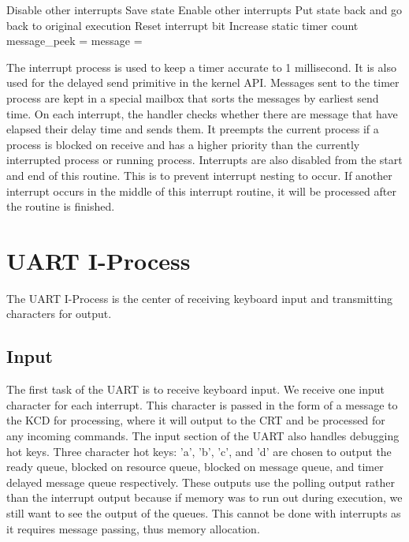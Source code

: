 \documentclass[12pt]{report}
\begin{document}
\begin{algorithmic}
        \State Disable other interrupts
        \State Save state
        \State {}
        \State Enable other interrupts
        \State Put state back and go back to original execution
    \EndFunction
    \bigskip
        \State Reset interrupt bit
        \State Increase static timer count
        \State message\_peek = 
            \State message = 
            \State {}
            \State {}
        \EndIf
    \EndFunction
\end{algorithmic}
The interrupt process is used to keep a timer accurate to 1 millisecond. It is also used for the delayed send primitive in the kernel API. Messages sent to the timer process are kept in a special mailbox that sorts the messages by earliest send time. On each interrupt, the handler checks whether there are message that have elapsed their delay time and sends them. It preempts the current process if a process is blocked on receive and has a higher priority than the currently interrupted process or running process. Interrupts are also disabled from the start and end of this routine. This is to prevent interrupt nesting to occur. If another interrupt occurs in the middle of this interrupt routine, it will be processed after the routine is finished.

\section{UART I-Process}
The UART I-Process is the center of receiving keyboard input and transmitting characters for output.

\subsection{Input}
\label{sec:uart_input}
The first task of the UART is to receive keyboard input. We receive one input character for each interrupt. This character is passed in the form of a message to the KCD for processing, where it will output to the CRT and be processed for any incoming commands. The input section of the UART also handles debugging hot keys. Three character hot keys: 'a', 'b', 'c', and 'd' are chosen to output the ready queue, blocked on resource queue, blocked on message queue, and timer delayed message queue respectively. These outputs use the polling output rather than the interrupt output because if memory was to run out during execution, we still want to see the output of the queues. This cannot be done with interrupts as it requires message passing, thus memory allocation.
\end{document}
